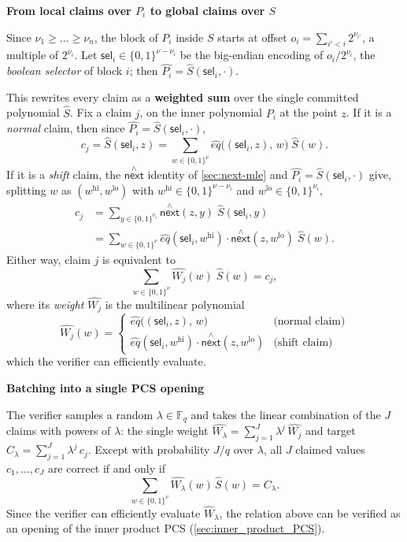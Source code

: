 \documentclass{article}
\theoremstyle{definition}
\newcommand{\Fq}{\mathbb F_q}
\newcommand{\nextmle}{\overset{\scriptscriptstyle\wedge}{\textsf{next}}}
\begin{document}
\textbf{From local claims over $P_i$ to global claims over $S$}

Since $\nu_1 \geq \dots \geq \nu_n$, the block of $P_i$ inside $S$ starts at offset $o_i = \sum_{i' < i} 2^{\nu_{i'}}$, a multiple of $2^{\nu_i}$. Let $\mathsf{sel}_i \in \{0,1\}^{\nu - \nu_i}$ be the big-endian encoding of $o_i / 2^{\nu_i}$, the \textit{boolean selector} of block $i$; then $\hat{P_i} = \hat{S}(\mathsf{sel}_i, \cdot)$.

This rewrites every claim as a \textbf{weighted sum} over the single committed polynomial $\hat{S}$. Fix a claim $j$, on the inner polynomial $P_i$ at the point $z$. If it is a \textit{normal} claim, then since $\hat{P_i} = \hat{S}(\mathsf{sel}_i, \cdot)$,
\[
c_j = \hat{S}(\mathsf{sel}_i, z) = \sum_{w \in \{0,1\}^{\nu}} \hat{eq}\big((\mathsf{sel}_i, z),\, w\big)\; \hat{S}(w) .
\]
If it is a \textit{shift} claim, the $\nextmle$ identity of \cref{sec:next-mle} and $\hat{P_i} = \hat{S}(\mathsf{sel}_i, \cdot)$ give, splitting $w$ as $(w^{\mathrm{hi}}, w^{\mathrm{lo}})$ with $w^{\mathrm{hi}} \in \{0,1\}^{\nu - \nu_i}$ and $w^{\mathrm{lo}} \in \{0,1\}^{\nu_i}$,
\[
\begin{aligned}
c_j &= \sum_{y \in \{0,1\}^{\nu_i}} \nextmle(z, y)\; \hat{S}(\mathsf{sel}_i, y) \\
    &= \sum_{w \in \{0,1\}^{\nu}} \hat{eq}(\mathsf{sel}_i, w^{\mathrm{hi}})\cdot \nextmle(z, w^{\mathrm{lo}})\; \hat{S}(w) .
\end{aligned}
\]
Either way, claim $j$ is equivalent to
\[
\sum_{w \in \{0,1\}^{\nu}} \hat{W_j}(w)\; \hat{S}(w) = c_j ,
\]
where its \textit{weight} $\hat{W_j}$ is the multilinear polynomial
\[
\hat{W_j}(w) =
\begin{cases}
\hat{eq}\big((\mathsf{sel}_i, z),\, w\big) & \text{(normal claim)} \\
\hat{eq}(\mathsf{sel}_i, w^{\mathrm{hi}})\cdot \nextmle(z, w^{\mathrm{lo}}) & \text{(shift claim)}
\end{cases}
\]
which the verifier can efficiently evaluate.

\textbf{Batching into a single PCS opening}

The verifier samples a random $\lambda \in \Fq$ and takes the linear combination of the $J$ claims with powers of $\lambda$: the single weight $\hat{W_\lambda} = \sum_{j=1}^{J} \lambda^{j}\, \hat{W_j}$ and target $C_\lambda = \sum_{j=1}^{J} \lambda^{j}\, c_j$. Except with probability $J / q$ over $\lambda$, all $J$ claimed values $c_1, \dots, c_J$ are correct if and only if
\[
\sum_{w \in \{0,1\}^{\nu}} \hat{W_\lambda}(w)\, \hat{S}(w) = C_\lambda .
\]
Since the verifier can efficiently evaluate $\hat{W}_\lambda$, the relation above can be verified as an opening of the inner product PCS (\cref{sec:inner_product_PCS}).
\end{document}
